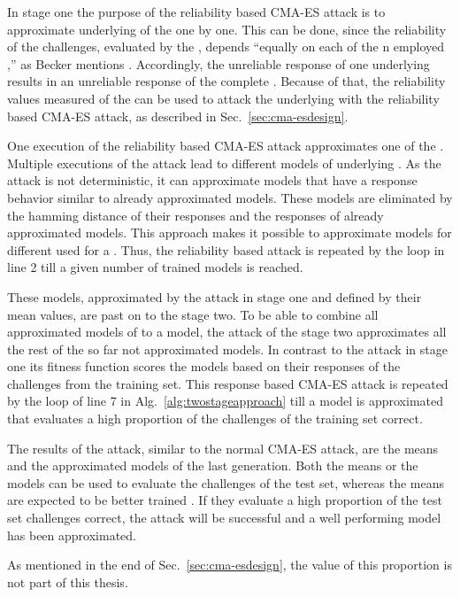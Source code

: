 In stage one the purpose of the reliability based \ac{CMA-ES} attack is to approximate underlying \apufs of the \xpuf one by one.
This can be done, since the reliability of the challenges, evaluated by the \xpuf, depends ``equally on each of the n employed \apufs,'' as Becker mentions \cite{Becker2015ThePUFs}. %
Accordingly, the unreliable response of one underlying \apuf results in an unreliable response of the complete \puf.
Because of that, the reliability values measured of the \xpuf can be used to attack the underlying \apufs with the reliability based \ac{CMA-ES} attack, as described in Sec.\ \ref{sec:cma-esdesign}.

One execution of the reliability based \ac{CMA-ES} attack approximates one of the \apufs.
Multiple executions of the attack lead to different models of underlying \apufs. %
As the attack is not deterministic, it can approximate models that have a response behavior similar to already approximated models.
These models are eliminated by the hamming distance of their responses and the responses of already approximated models. %
This approach makes it possible to approximate models for different \apufs used for a \xpuf.
Thus, the reliability based attack is repeated by the loop in line 2 till a given number of trained models is reached.

These models, approximated by the attack in stage one and defined by their mean values, are past on to the stage two.
To be able to combine all approximated models of \apuf to a \xpuf model, the attack of the stage two approximates all the rest of the so far not approximated models. %
In contrast to the attack in stage one its fitness function scores the models based on their responses of the challenges from the training set. %
This response based \ac{CMA-ES} attack is repeated by the loop of line 7 in Alg.\ \ref{alg:twostageapproach} till a model is approximated that evaluates a high proportion of the challenges of the training set correct.

The results of the attack, similar to the normal \ac{CMA-ES} attack, are the means and the approximated models of the last generation.
Both the means or the models can be used to evaluate the challenges of the test set, whereas the means are expected to be better trained \cite{Hansen2011TheTutorial}.
If they evaluate a high proportion of the test set challenges correct, the attack will be successful and a well performing model has been approximated. %

As mentioned in the end of Sec.\ \ref{sec:cma-esdesign}, the value of this proportion is not part of this thesis.

